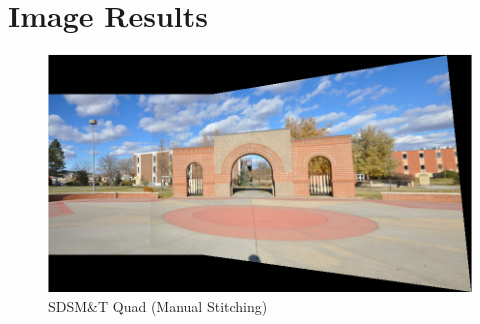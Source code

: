 \documentclass[12pt,journal,compsoc]{IEEEtran}
\begin{document}

%


\appendices
\section{Image Results}


\begin{figure}[h]
	\centering
		  \centering
		  \includegraphics[width=1\linewidth]{img/autoquad1}
		  \caption{SDSM\&T Quad (Manual Stitching)}
		  \label{fig:autoquad1}
\end{figure}
\end{document}
